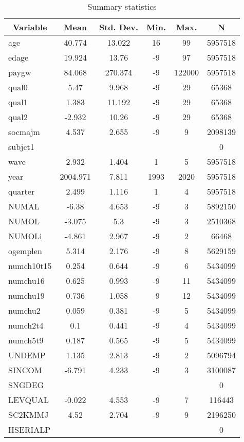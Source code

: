 
\begin{table}[htbp]\centering \caption{Summary statistics \label{sumstats}}
\begin{tabular}{l c c c c c}\hline\hline
\multicolumn{1}{c}{\textbf{Variable}} & \textbf{Mean}
 & \textbf{Std. Dev.}& \textbf{Min.} &  \textbf{Max.} & \textbf{N}\\ \hline
age & 40.774 & 13.022 & 16 & 99 & 5957518\\
edage & 19.924 & 13.76 & -9 & 97 & 5957518\\
paygw & 84.068 & 270.374 & -9 & 122000 & 5957518\\
qual0 & 5.47 & 9.968 & -9 & 29 & 65368\\
qual1 & 1.383 & 11.192 & -9 & 29 & 65368\\
qual2 & -2.932 & 10.26 & -9 & 29 & 65368\\
socmajm & 4.537 & 2.655 & -9 & 9 & 2098139\\
subjct1 &  &  &  &  & 0\\
wave & 2.932 & 1.404 & 1 & 5 & 5957518\\
year & 2004.971 & 7.811 & 1993 & 2020 & 5957518\\
quarter & 2.499 & 1.116 & 1 & 4 & 5957518\\
NUMAL & -6.38 & 4.653 & -9 & 3 & 5892150\\
NUMOL & -3.075 & 5.3 & -9 & 3 & 2510368\\
NUMOLi & -4.861 & 2.967 & -9 & 2 & 66468\\
ogemplen & 5.314 & 2.176 & -9 & 8 & 5629159\\
numch10t15 & 0.254 & 0.644 & -9 & 6 & 5434099\\
numchu16 & 0.625 & 0.993 & -9 & 11 & 5434099\\
numchu19 & 0.736 & 1.058 & -9 & 12 & 5434099\\
numchu2 & 0.059 & 0.381 & -9 & 5 & 5434099\\
numch2t4 & 0.1 & 0.441 & -9 & 4 & 5434099\\
numch5t9 & 0.187 & 0.565 & -9 & 5 & 5434099\\
UNDEMP & 1.135 & 2.813 & -9 & 2 & 5096794\\
SINCOM & -6.791 & 4.233 & -9 & 3 & 3100087\\
SNGDEG &  &  &  &  & 0\\
LEVQUAL & -0.022 & 4.553 & -9 & 7 & 116443\\
SC2KMMJ & 4.52 & 2.704 & -9 & 9 & 2196250\\
HSERIALP &  &  &  &  & 0\\

\end{tabular}
\end{table}
